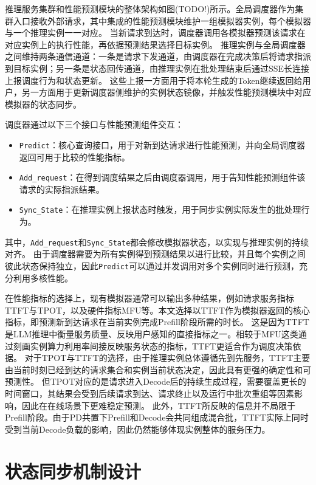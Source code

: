 推理服务集群和性能预测模块的整体架构如图(TODO!)所示。全局调度器作为集群入口接收外部请求，其中集成的性能预测模块维护一组模拟器实例，每个模拟器与一个推理实例一一对应。
当新请求到达时，调度器调用各模拟器预测该请求在对应实例上的执行性能，再依据预测结果选择目标实例。
推理实例与全局调度器之间维持两条通信通道：一条是请求下发通道，由调度器在完成决策后将请求指派到目标实例；另一条是状态回传通道，由推理实例在批处理结束后通过SSE长连接上报调度行为和状态更新。
这些上报一方面用于将本轮生成的Token继续返回给用户，另一方面用于更新调度器侧维护的实例状态镜像，并触发性能预测模块中对应模拟器的状态同步。

调度器通过以下三个接口与性能预测组件交互：
\begin{itemize}
  \item \texttt{Predict}：核心查询接口，用于对新到达请求进行性能预测，并向全局调度器返回可用于比较的性能指标。
  \item \texttt{Add\_request}：在得到调度结果之后由调度器调用，用于告知性能预测组件该请求的实际指派结果。
  \item \texttt{Sync\_State}：在推理实例上报状态时触发，用于同步实例实际发生的批处理行为。
\end{itemize}
其中，\texttt{Add\_request}和\texttt{Sync\_State}都会修改模拟器状态，以实现与推理实例的持续对齐。
由于调度器需要为所有实例得到预测结果以进行比较，并且每个实例之间彼此状态保持独立，因此\texttt{Predict}可以通过并发调用对多个实例同时进行预测，充分利用多核性能。

在性能指标的选择上，现有模拟器通常可以输出多种结果，例如请求服务指标TTFT与TPOT，以及硬件指标MFU等。本文选择以TTFT作为模拟器返回的核心指标，即预测新到达请求在当前实例完成Prefill阶段所需的时长。
这是因为TTFT是LLM推理中衡量服务质量、反映用户感知的直接指标之一。相较于MFU这类通过刻画实例算力利用率间接反映服务状态的指标，TTFT更适合作为调度决策依据。
对于TPOT与TTFT的选择，由于推理实例总体遵循先到先服务，TTFT主要由当前时刻已经到达的请求集合和实例当前状态决定，因此具有更强的确定性和可预测性。
但TPOT对应的是请求进入Decode后的持续生成过程，需要覆盖更长的时间窗口，其结果会受到后续请求到达、请求终止以及运行中批次重组等因素影响，因此在在线场景下更难稳定预测。
此外，TTFT所反映的信息并不局限于Prefill阶段。由于PD共置下Prefill和Decode会共同组成混合批，TTFT实际上同时受到当前Decode负载的影响，因此仍然能够体现实例整体的服务压力。


\section{状态同步机制设计}


